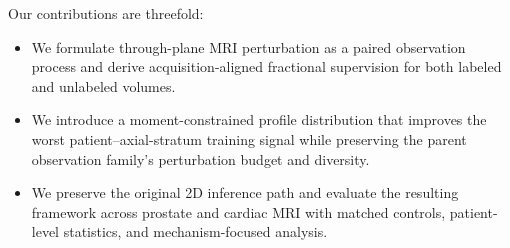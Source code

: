 Our contributions are threefold:
\begin{itemize}
    \item We formulate through-plane MRI perturbation as a paired observation process and derive acquisition-aligned fractional supervision for both labeled and unlabeled volumes.
    \item We introduce a moment-constrained profile distribution that improves the worst patient--axial-stratum training signal while preserving the parent observation family's perturbation budget and diversity.
    \item We preserve the original 2D inference path and evaluate the resulting framework across prostate and cardiac MRI with matched controls, patient-level statistics, and mechanism-focused analysis.
\end{itemize}
